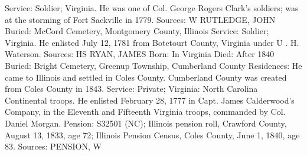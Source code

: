 Service: Soldier; Virginia. He was one of Col. George Rogers Clark's soldiers; was at the storming of Fort Sackville in 1779.
Sources: W 
RUTLEDGE, JOHN
Buried: McCord Cemetery, Montgomery County, Illinois
Service: Soldier; Virginia. He enlisted July 12, 1781 from Botetourt County, Virginia under U . H. Waterson.
Sources: HS 
RYAN, JAMES
Born: In Virginia
Died:  After 1840
Buried: Bright Cemetery, Greenup Township, Cumberland County 
Residences: He came to Illinois and settled in Coles County. Cumberland County was created from Coles County in 1843. 
Service: Private; Virginia: North Carolina Continental troops. He enlisted February 28, 1777 in Capt. James Calderwood's Company, in the Eleventh and Fifteenth Virginia troops, commanded by Col. Daniel Morgan. 
Pension: S32501 (NC); Illinois pension roll, Crawford County, August 13, 1833, age 72; Illinois Pension Census, Coles County, June 1, 1840, age 83. 
Sources: PENSION, W 

